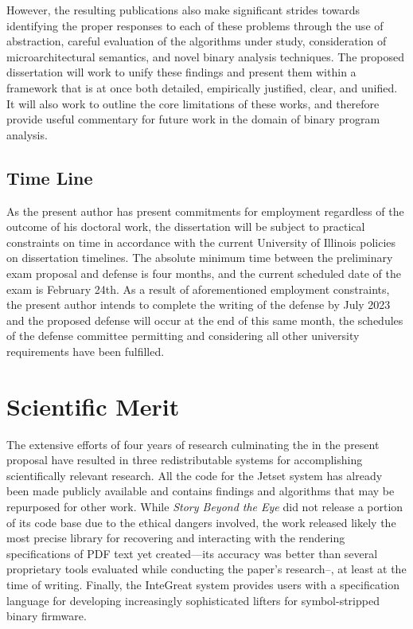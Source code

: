 However, the resulting publications also make significant strides towards identifying the proper responses to each of these problems through the use of abstraction, careful evaluation of the algorithms under study, consideration of microarchitectural semantics, and novel binary analysis techniques.
The proposed dissertation will work to unify these findings and present them within a framework that is at once both detailed, empirically justified, clear, and unified.
It will also work to outline the core limitations of these works, and therefore provide useful commentary for future work in the domain of binary program analysis.

\subsection{Time Line}

As the present author has present commitments for employment regardless of the outcome of his doctoral work, the dissertation will be subject to practical constraints on time in accordance with the current University of Illinois policies on dissertation timelines.
The absolute minimum time between the preliminary exam proposal and defense is four months, and the current scheduled date of the exam is February 24th.
As a result of aforementioned employment constraints, the present author intends to complete the writing of the defense by July 2023 and the proposed defense will occur at the end of this same month, the schedules of the defense committee permitting and considering all other university requirements have been fulfilled.

\section{Scientific Merit}

The extensive efforts of four years of research culminating the in the present proposal have resulted in three redistributable systems for accomplishing scientifically relevant research.
All the code for the Jetset system has already been made publicly available and contains findings and algorithms that may be repurposed for other work.
While \emph{Story Beyond the Eye} did not release a portion of its code base due to the ethical dangers involved, the work released likely the most precise library for recovering and interacting with the rendering specifications of PDF text yet created---its accuracy was better than several proprietary tools evaluated while conducting the paper's research--, at least at the time of writing.
Finally, the InteGreat system provides users with a specification language for developing increasingly sophisticated lifters for symbol-stripped binary firmware.


